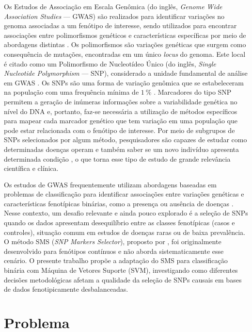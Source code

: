 \documentclass[
    12pt,
    a4paper,
    oneside,
    english,
    french,
    spanish,
    brazil
    ]{abntex2}
\begin{document}
Os Estudos de Associação em Escala Genômica (do inglês, \emph{Genome Wide Association Studies} --- GWAS) são realizados para identificar variações no genoma associadas a um fenótipo de interesse, sendo utilizados para encontrar associações entre polimorfismos genéticos e características específicas por meio de abordagens distintas \cite{welter2014}. Os polimorfismos são variações genéticas que surgem como consequência de mutações, encontradas em um único \textit{locus} do genoma. Este local é citado como um Polimorfismo de Nucleotídeo Único (do inglês, \emph{Single Nucleotide Polymorphism} --- SNP), considerado a unidade fundamental de análise em GWAS \cite{Setiawan2018}. Os SNPs são uma forma de variação genômica que se estabeleceram na população com uma frequência mínima de $\SI{1}{\percent}$ \cite{Brookes1999}. Marcadores do tipo SNP permitem a geração de inúmeras informações sobre a variabilidade genética no nível do DNA e, portanto, faz-se necessária a utilização de métodos específicos para mapear cada marcador genético que tem variação em uma população que pode estar relacionada com o fenótipo de interesse. Por meio de subgrupos de SNPs selecionados por algum método, pesquisadores são capazes de estudar como determinadas doenças operam e também saber se um novo indivíduo apresenta determinada condição \cite{Adeline2015}, o que torna esse tipo de estudo de grande relevância científica e clínica.

Os estudos de GWAS frequentemente utilizam abordagens baseadas em problemas de classificação para identificar associações entre variações genéticas e características fenotípicas binárias, como a presença ou ausência de doenças \cite{bush2012,visscher2017}. Nesse contexto, um desafio relevante e ainda pouco explorado é a seleção de SNPs quando os dados apresentam desequilíbrio entre as classes fenotípicas (casos e controles), situação comum em estudos de doenças raras ou de baixa prevalência. O método SMS (\textit{SNP Markers Selector}), proposto por , foi originalmente desenvolvido para fenótipos contínuos e não aborda sistematicamente esse cenário. O presente trabalho propõe a adaptação do SMS para classificação binária com Máquina de Vetores Suporte (SVM), investigando como diferentes decisões metodológicas afetam a qualidade da seleção de SNPs causais em bases de dados fenotipicamente desbalanceadas.

\section{Problema}
\end{document}
